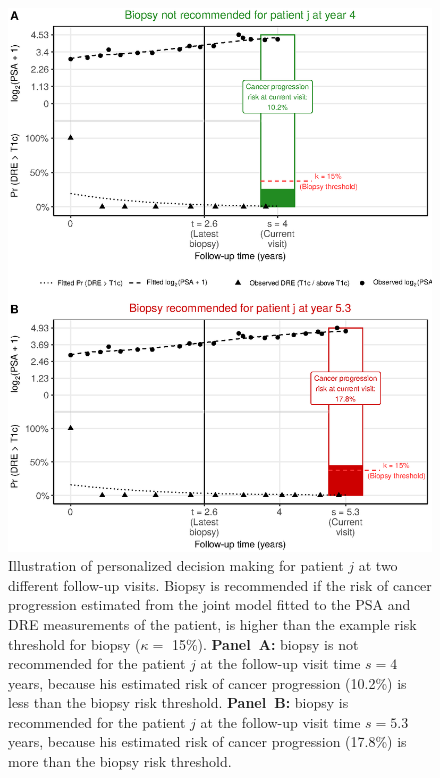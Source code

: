 \begin{figure}[!htb]
\captionsetup{justification=justified}
\centerline{\includegraphics[width=\columnwidth]{images/dynRiskPlot_2340.eps}}
\caption{Illustration of personalized decision making for patient $j$ at two different follow-up visits. Biopsy is recommended if the risk of cancer progression estimated from the joint model fitted to the PSA and DRE measurements of the patient, is higher than the example risk threshold for biopsy ($\kappa=$ 15\%). \textbf{Panel~A:} biopsy is not recommended for the patient $j$ at the follow-up visit time $s=4$ years, because his estimated risk of cancer progression (10.2\%) is less than the biopsy risk threshold. \textbf{Panel~B:} biopsy is recommended for the patient $j$ at the follow-up visit time $s=5.3$ years, because his estimated risk of cancer progression (17.8\%) is more than the biopsy risk threshold.}
\label{fig:dynRiskPlot_2340}
\end{figure}

